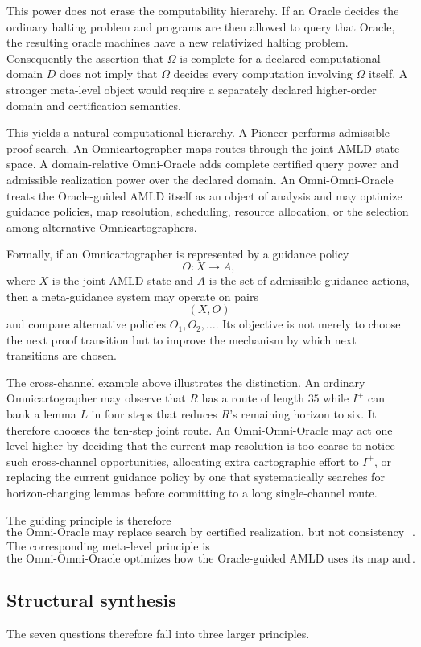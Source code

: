 \documentclass[11pt]{article}
\begin{document}
This power does not erase the computability hierarchy.  If an Oracle decides the ordinary halting problem and programs are then allowed to query that Oracle, the resulting oracle machines have a new relativized halting problem.  Consequently the assertion that $\Omega$ is complete for a declared computational domain $D$ does not imply that $\Omega$ decides every computation involving $\Omega$ itself.  A stronger meta-level object would require a separately declared higher-order domain and certification semantics.

This yields a natural computational hierarchy.  A Pioneer performs admissible proof search.  An Omnicartographer maps routes through the joint AMLD state space.  A domain-relative Omni-Oracle adds complete certified query power and admissible realization power over the declared domain.  An Omni-Omni-Oracle treats the Oracle-guided AMLD itself as an object of analysis and may optimize guidance policies, map resolution, scheduling, resource allocation, or the selection among alternative Omnicartographers.

Formally, if an Omnicartographer is represented by a guidance policy
\[
O:X\to A,
\]
where $X$ is the joint AMLD state and $A$ is the set of admissible guidance actions, then a meta-guidance system may operate on pairs
\[
(X,O)
\]
and compare alternative policies $O_1,O_2,\ldots$.  Its objective is not merely to choose the next proof transition but to improve the mechanism by which next transitions are chosen.

The cross-channel example above illustrates the distinction.  An ordinary Omnicartographer may observe that $R$ has a route of length $35$ while $I^+$ can bank a lemma $L$ in four steps that reduces $R$'s remaining horizon to six.  It therefore chooses the ten-step joint route.  An Omni-Omni-Oracle may act one level higher by deciding that the current map resolution is too coarse to notice such cross-channel opportunities, allocating extra cartographic effort to $I^+$, or replacing the current guidance policy by one that systematically searches for horizon-changing lemmas before committing to a long single-channel route.

The guiding principle is therefore
\[
\boxed{\text{the Omni-Oracle may replace search by certified realization, but not consistency or verification}.}
\]
The corresponding meta-level principle is
\[
\boxed{\text{the Omni-Omni-Oracle optimizes how the Oracle-guided AMLD uses its map and its Pioneers}.}
\]

\subsection{Structural synthesis}
The seven questions therefore fall into three larger principles.
\end{document}
